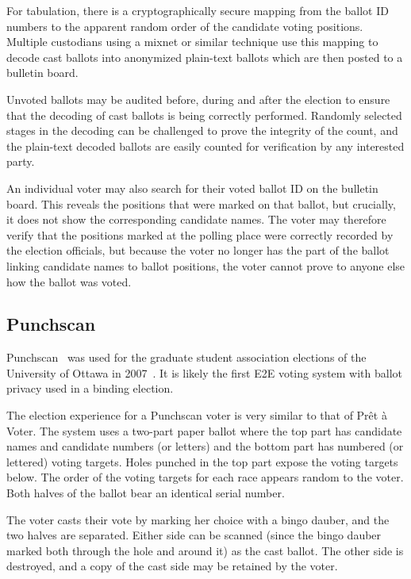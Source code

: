For tabulation, there is a cryptographically secure mapping from the
ballot ID numbers to the apparent random order of the candidate voting
positions. Multiple custodians using a mixnet or similar technique use
this mapping to decode cast ballots into anonymized plain-text ballots
which are then posted to a bulletin board.

Unvoted ballots may be audited before, during and after the election
to ensure that the decoding of cast ballots is being correctly
performed. Randomly selected stages in the decoding can be challenged
to prove the integrity of the count, and the plain-text decoded
ballots are easily counted for verification by any interested party.

An individual voter may also search for their voted ballot ID on the
bulletin board. This reveals the positions that were marked on that
ballot, but crucially, it does not show the corresponding candidate
names. The voter may therefore verify that the positions marked at the
polling place were correctly recorded by the election officials, but
because the voter no longer has the part of the ballot linking
candidate names to ballot positions, the voter cannot prove to anyone
else how the ballot was voted.

\subsection{Punchscan}
\label{sec:punchscan}

Punchscan~\cite{popoveniuc2006,popoveniuc2010punchscan} was used for
the graduate student association elections of the University of Ottawa
in 2007~\cite{essex2007}. It is likely the first E2E voting system
with ballot privacy used in a binding election.

The election experience for a Punchscan voter is very similar to that
of Prêt à Voter. The system uses a two-part paper ballot where the top
part has candidate names and candidate numbers (or letters) and the
bottom part has numbered (or lettered) voting targets. Holes punched
in the top part expose the voting targets below. The order of the
voting targets for each race appears random to the voter. Both halves
of the ballot bear an identical serial number.

The voter casts their vote by marking her choice with a bingo dauber,
and the two halves are separated. Either side can be scanned (since
the bingo dauber marked both through the hole and around it) as the
cast ballot. The other side is destroyed, and a copy of the cast side
may be retained by the voter.

